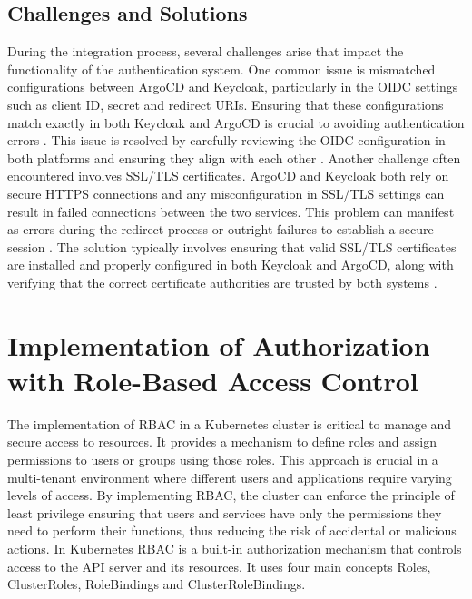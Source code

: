 \clearpage

\subsection{Challenges and Solutions}

During the integration process, several challenges arise that impact the functionality of the authentication system. One common issue is mismatched configurations between ArgoCD and Keycloak, particularly in the OIDC settings such as client ID, secret and redirect URIs. Ensuring that these configurations match exactly in both Keycloak and ArgoCD is crucial to avoiding authentication errors \cite{oauth_oidc_intro}. This issue is resolved by carefully reviewing the OIDC configuration in both platforms and ensuring they align with each other \cite{keycloak_doc}. Another challenge often encountered involves SSL/TLS certificates. ArgoCD and Keycloak both rely on secure HTTPS connections and any misconfiguration in SSL/TLS settings can result in failed connections between the two services. This problem can manifest as errors during the redirect process or outright failures to establish a secure session \cite{Kubernetes_doc}. The solution typically involves ensuring that valid SSL/TLS certificates are installed and properly configured in both Keycloak and ArgoCD, along with verifying that the correct certificate authorities are trusted by both systems \cite{argocd_docs}.

\section{Implementation of Authorization with Role-Based Access Control}

The implementation of RBAC in a Kubernetes cluster is critical to manage and secure access to resources. It provides a mechanism to define roles and assign permissions to users or groups using those roles. This approach is crucial in a multi-tenant environment where different users and applications require varying levels of access. By implementing RBAC, the cluster can enforce the principle of least privilege ensuring that users and services have only the permissions they need to perform their functions, thus reducing the risk of accidental or malicious actions. In Kubernetes RBAC is a built-in authorization mechanism that controls access to the API server and its resources. It uses four main concepts Roles, ClusterRoles, RoleBindings and ClusterRoleBindings. \cite{Kubernetes_doc}

